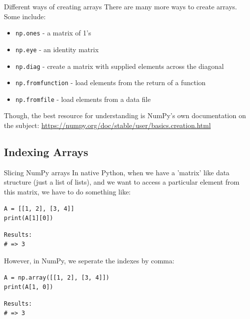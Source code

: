 \documentclass[10pt]{beamer}
\begin{document}
\begin{frame}[label={sec:org99a7fac},fragile]{Different ways of creating arrays}
 There are many more ways to create arrays. Some include:

\begin{itemize}
\item \texttt{np.ones}  - a matrix of 1's
\item \texttt{np.eye} - an identity matrix
\item \texttt{np.diag} - create a matrix with supplied elements across the diagonal
\item \texttt{np.fromfunction} - load elements from the return of a function
\item \texttt{np.fromfile} - load elements from a data file
\end{itemize}

Though, the best resource for understanding is NumPy's own documentation on the
subject: \url{https://numpy.org/doc/stable/user/basics.creation.html}
\end{frame}

\subsection{Indexing Arrays}
\label{sec:orgbfa62a3}

\begin{frame}[label={sec:orgf1b9bc9},fragile]{Slicing NumPy arrays}
 In native Python, when we have a 'matrix' like data structure (just a list of lists),
and we want to access a particular element from this matrix, we have to do something
like:

\begin{verbatim}
A = [[1, 2], [3, 4]]
print(A[1][0])
\end{verbatim}

\begin{verbatim}
Results: 
# => 3
\end{verbatim}


However, in NumPy, we seperate the indexes by comma:

\begin{verbatim}
A = np.array([[1, 2], [3, 4]])
print(A[1, 0])
\end{verbatim}

\begin{verbatim}
Results: 
# => 3
\end{verbatim}
\end{frame}
\end{document}
